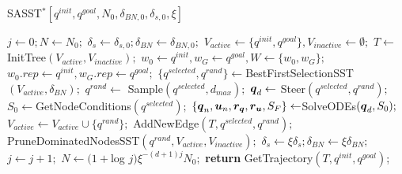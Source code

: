 \begin{algorithm}[t]
    \caption{SASST$^* [q^{init}, q^{goal}, N_0, \delta_{BN,0}, \delta_{s,0}, \xi]$}\label{alg:SASST*}
    \begin{algorithmic}[1]
        \State $j \gets 0; N \gets N_0;$
        \State $\delta_{s} \gets \delta_{s,0}; \delta_{BN} \gets \delta_{BN,0};$
        \State $V_{active} \gets \{q^{init}, q^{goal}\}, V_{inactive} \gets \emptyset;$
        \State $T \gets$ InitTree$(V_{active}, V_{inactive});$
        \State $w_0 \gets q^{init}, w_G \gets q^{goal}, W \gets \{w_0, w_G\};$
        \State $w_0.rep \gets q^{init}, w_G.rep \gets q^{goal};$
                \State $\{q^{selected}, q^{rand}\} \gets $BestFirstSelectionSST$(V_{active}, \delta_{BN});$
                \State $q^{rand} \gets$ Sample$(q^{selected}, d_{max});$
                \State $\boldsymbol{q}_d \gets$ Steer$({q^{selected}},{q^{rand}});$
                \State $S_0 \gets $GetNodeConditions$({q^{selected}});$
                \State $\left \{\boldsymbol{q}_n, \boldsymbol{u}_n, \boldsymbol{r_q}, \boldsymbol{r_u}, S_F \right \}  \gets $SolveODEs$(\boldsymbol{q}_d, S_0);$
                        \State $V_{active} \gets V_{active} \cup \{q^{rand}\};$
                        \State AddNewEdge$(T, q^{selected}, q^{rand});$
                        \State PruneDominatedNodesSST$(q^{rand}, V_{active}, V_{inactive});$
                    \EndIf
                \EndIf
            \EndFor
            \State $\delta_s \gets \xi\delta_s; \delta_{BN}\gets\xi\delta_{BN};$
            \State $j \gets j+1;$
            \State $N \gets (1+$log $j)\xi^{-(d+1)j}N_0;$
        \EndWhile
        \State \textbf{return} GetTrajectory$(T, q^{init}, q^{goal})$;
    \end{algorithmic}
\end{algorithm}

